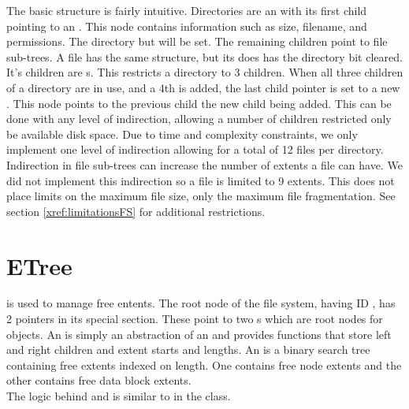   The basic structure is fairly intuitive.  Directories are an
   with its first child pointing to an .  
  This node contains information such as size, filename, and permissions.
  The directory but will be set. The remaining children point to file sub-trees.
  A file has the same structure, but its  does has the directory bit cleared.
  It's children are s.
  This restricts a directory to 3 children.  When all
  three children of a directory are in use, and a 4th is added, the last 
  child pointer is set to a new . This node points to 
  the previous child the new child being added.
  This can be done with any level of indirection, allowing a number of children
  restricted only be available disk space.
  Due to time and complexity constraints, we only implement one level of indirection allowing
  for a total of 12 files per directory. \\
  Indirection in file sub-trees can increase the number of extents a file can have. We
  did not implement this indirection so a file is limited to 9 extents. This does
  not place limits on the maximum file size, only the maximum file fragmentation.
  See section \ref{xref:limitationsFS} for additional restrictions.

\section{ETree}
\label{xref:etreeFS}
   is used to manage free entents.  The root node of the file system, having
  ID , has 2 pointers in its special section. These 
  point to two s which are root nodes for  objects.
  An  is simply an abstraction of an  and provides
  functions that store left and right children and extent starts and lengths. An 
  is a binary search tree containing free extents indexed on length. One  contains
  free node extents and the other contains free data block extents.\\

  The logic behind  and  is similar to
   in the  class.

